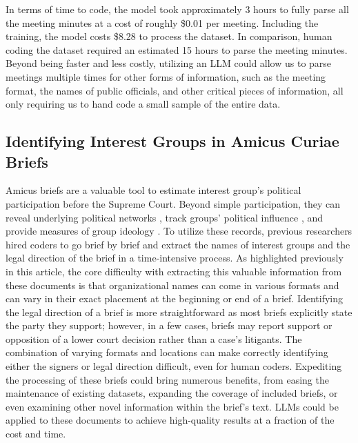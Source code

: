     In terms of time to code, the model took approximately 3 hours to fully parse all the meeting minutes at a cost of roughly \$0.01 per meeting. Including the training, the model costs \$8.28 to process the dataset. In comparison, human coding the dataset required an estimated 15 hours to parse the meeting minutes. Beyond being faster and less costly, utilizing an LLM could allow us to parse meetings multiple times for other forms of information, such as the meeting format, the names of public officials, and other critical pieces of information, all only requiring us to hand code a small sample of the entire data.

    
    \subsection{Identifying Interest Groups in Amicus Curiae Briefs}
    Amicus briefs are a valuable tool to estimate interest group's political participation before the Supreme Court. Beyond simple participation, they can reveal underlying political networks \citep{Box-Steffensmeier:2015b}, track  groups' political influence \citep{box-steffensmeierQualityQuantityAmici2013}, and  provide measures of group ideology \citep{abi-hassanIdeologiesOrganizedInterests2023}. To utilize these records, previous researchers hired coders to go brief by brief and extract the names of interest groups and the legal direction of the brief in a time-intensive process. As highlighted previously in this article, the core difficulty with extracting this valuable information from these documents is that organizational names can come in various formats and can vary in their exact placement at the beginning or end of a brief. Identifying the legal direction of a brief is more straightforward as most briefs explicitly state the party they support; however, in a few cases, briefs may report support or opposition of a lower court decision rather than a case's litigants. The combination of varying formats and locations can make correctly identifying either the signers or legal direction difficult, even for human coders. Expediting the processing of these briefs could bring numerous benefits, from easing the maintenance of existing datasets, expanding the coverage of included briefs, or even examining other novel information within the brief's text. LLMs could be applied to these documents to achieve high-quality results at a fraction of the cost and time.

